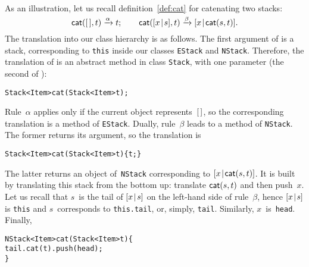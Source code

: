 As an illustration, let us
recall definition~\eqref{def:cat} 
 for catenating two stacks:
\begin{equation*}
\textsf{cat}(        [\,],t) \xrightarrow{\smash{\alpha}} t;\qquad
\textsf{cat}([{x}\!\mid\!{s}],t) \xrightarrow{\smash{\beta}}
                                          [{x}\!\mid\!{\textsf{cat}(s,t)}].
\end{equation*}
The translation into our \Java class hierarchy is as follows. The
first argument of  is a stack, corresponding to
\texttt{this} inside our classes \texttt{EStack} and
\texttt{NStack}. Therefore, the translation of  is an
abstract \Java method in class \texttt{Stack}, with one parameter (the
second of ):
\begin{alltt}
\public \abstractX Stack<Item> cat(\final Stack<Item> t);
\end{alltt}
Rule~\(\alpha\) applies only if the current object represents~\([\,]\),
so the corresponding translation is a method of
\texttt{EStack}. Dually, rule~\(\beta\) leads to a method of
\texttt{NStack}. The former returns its argument, so the translation
is
\begin{alltt}
\public Stack<Item> cat(\final Stack<Item> t) \{ \return t; \}
\end{alltt}
The latter returns an object of~\texttt{NStack} corresponding to
\([{x}\!\mid\!{\textsf{cat}(s,t)}]\). It is built by translating this stack
from the bottom up: translate
\(\textsf{cat}(s,t)\) and then push~\(x\). Let
us recall that \(s\)~is the tail of \([{x}\!\mid\!{s}]\) on the
left\hyp{}hand side of rule~\(\beta\), hence \([{x}\!\mid\!{s}]\) is
\texttt{this} and \(s\)~corresponds to \texttt{this.tail}, or, simply,
\texttt{tail}. Similarly, \(x\)~is~\texttt{head}. Finally,
\begin{alltt}
\public NStack<Item> cat(\final Stack<Item> t) \{
  \return tail.cat(t).push(head);
\}
\end{alltt}
